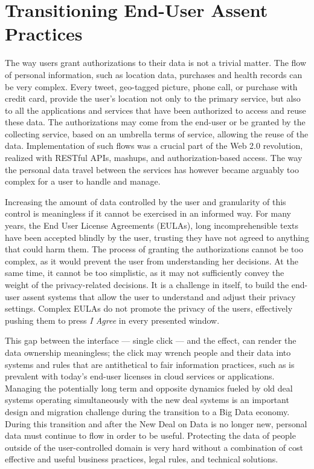 \section{Transitioning End-User Assent Practices }

The way users grant authorizations to their data is not a trivial matter.
The flow of personal information, such as location data, purchases and health records can be very complex.
Every tweet, geo-tagged picture, phone call, or purchase with credit card, provide the user's location not only to the primary service, but also to all the applications and services that have been authorized to access and reuse these data.
The authorizations may come from the end-user or be granted by the collecting service, based on an umbrella terms of service, allowing the reuse of the data.
Implementation of such flows was a crucial part of the Web 2.0 revolution, realized with RESTful APIs, mashups, and authorization-based access.
The way the personal data travel between the services has however became arguably too complex for a user to handle and manage.

Increasing the amount of data controlled by the user and granularity of this control is meaningless if it cannot be exercised in an informed way.
For many years, the End User License Agreements (EULAs), long incomprehensible texts have been accepted blindly by the user, trusting they have not agreed to anything that could harm them.
The process of granting the authorizations cannot be too complex, as it would prevent the user from understanding her decisions.
At the same time, it cannot be too simplistic, as it may not sufficiently convey the weight of the privacy-related decisions.
It is a challenge in itself, to build the end-user assent systems that allow the user to understand and adjust their privacy settings.
Complex EULAs do not promote the privacy of the users, effectively pushing them to press \emph{I Agree} in every presented window. 

This gap between the interface --- single click --- and the effect, can render the data ownership meaningless; the click may wrench people and their data into systems and rules that are antithetical to fair information practices, such as is prevalent with today's end-user licenses in cloud services or applications.
Managing the potentially long term and opposite dynamics fueled by old deal systems operating simultaneously with the new deal systems is an important design and migration challenge during the transition to a Big Data economy.
During this transition and after the New Deal on Data is no longer new, personal data must continue to flow in order to be useful.
Protecting the data of people outside of the user-controlled domain is very hard without a combination of cost effective and useful business practices, legal rules, and technical solutions.

